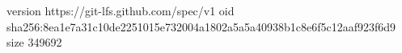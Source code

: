 version https://git-lfs.github.com/spec/v1
oid sha256:8ea1e7a31c10de2251015e732004a1802a5a5a40938b1c8e6f5c12aaf923f6d9
size 349692
